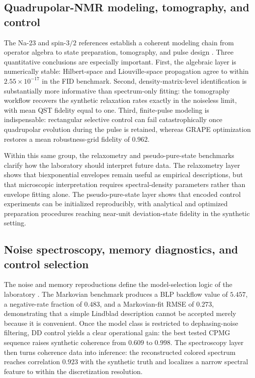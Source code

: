\documentclass[11pt,a4paper]{article}
\begin{document}
\subsection{Quadrupolar-NMR modeling, tomography, and control}

The Na-23 and spin-$3/2$ references establish a coherent modeling chain from
operator algebra to state preparation, tomography, and pulse design
\citep{na23_relaxometry_2023,spin32_algebraic_2004,qst_relaxation_2008,
spin32_qlogic_qst_2005,quadrupolar_qip_2012,grape_nmr_control_2005,
pps_optimal_control_2012}.  Three quantitative conclusions are especially
important.  First, the algebraic layer is numerically stable: Hilbert-space and
Liouville-space propagation agree to within $2.55\times10^{-17}$ in the FID
benchmark.  Second, density-matrix-level identification is substantially more
informative than spectrum-only fitting: the tomography workflow recovers the
synthetic relaxation rates exactly in the noiseless limit, with mean QST
fidelity equal to one.  Third, finite-pulse modeling is indispensable:
rectangular selective control can fail catastrophically once quadrupolar
evolution during the pulse is retained, whereas GRAPE optimization restores a
mean robustness-grid fidelity of $0.962$.

Within this same group, the relaxometry and pseudo-pure-state benchmarks clarify
how the laboratory should interpret future data.  The relaxometry layer shows
that biexponential envelopes remain useful as empirical descriptions, but that
microscopic interpretation requires spectral-density parameters rather than
envelope fitting alone.  The pseudo-pure-state layer shows that encoded control
experiments can be initialized reproducibly, with analytical and optimized
preparation procedures reaching near-unit deviation-state fidelity in the
synthetic setting.

\subsection{Noise spectroscopy, memory diagnostics, and control selection}

The noise and memory reproductions define the model-selection logic of the
laboratory \citep{nonmarkov_noise_2022,nonmarkov_process_tensor_2020,
noise_filtering_control_2014,dd_noise_spectroscopy_2011,
flux_qubit_noise_spectroscopy_2011}.  The Markovian benchmark produces a BLP
backflow value of $5.457$, a negative-rate fraction of $0.483$, and a
Markovian-fit RMSE of $0.273$, demonstrating that a simple Lindblad description
cannot be accepted merely because it is convenient.  Once the model class is
restricted to dephasing-noise filtering, DD control yields a clear operational
gain: the best tested CPMG sequence raises synthetic coherence from $0.609$ to
$0.998$.  The spectroscopy layer then turns coherence data into inference: the
reconstructed colored spectrum reaches correlation $0.923$ with the synthetic
truth and localizes a narrow spectral feature to within the discretization
resolution.
\end{document}
